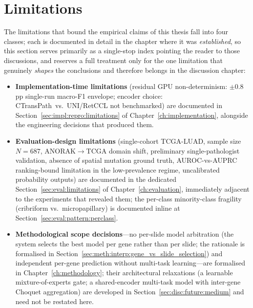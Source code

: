 \section{Limitations}
\label{sec:disc:limitations}

The limitations that bound the empirical claims of this thesis
fall into four classes; each is documented in detail in the
chapter where it was \emph{established}, so this section serves
primarily as a single-stop index pointing the reader to those
discussions, and reserves a full treatment only for the one
limitation that genuinely \emph{shapes} the conclusions and
therefore belongs in the discussion chapter:

\begin{itemize}
    \item \textbf{Implementation-time limitations} (residual GPU
    non-determinism: $\pm 0.8$\,pp single-run macro-F1 envelope;
    encoder choice: CTransPath~vs.\ UNI/RetCCL not benchmarked)
    are documented in
    Section~\ref{sec:impl:repro:limitations} of
    Chapter~\ref{ch:implementation}, alongside the engineering
    decisions that produced them.
    \item \textbf{Evaluation-design limitations} (single-cohort
    TCGA-LUAD, sample size $N=687$, ANORAK$\to$TCGA domain shift,
    preliminary single-pathologist validation, absence of spatial
    mutation ground truth, AUROC-vs-AUPRC ranking-bound limitation
    in the low-prevalence regime, uncalibrated probability
    outputs) are documented in the dedicated
    Section~\ref{sec:eval:limitations} of
    Chapter~\ref{ch:evaluation}, immediately adjacent to the
    experiments that revealed them; the per-class minority-class
    fragility (cribriform vs.\ micropapillary) is documented
    inline at Section~\ref{sec:eval:pattern:perclass}.
    \item \textbf{Methodological scope decisions}---no per-slide
    model arbitration (the system selects the best model per
    gene rather than per slide; the rationale is formalised in
    Section~\ref{sec:meth:interp:gene_vs_slide_selection}) and
    independent per-gene prediction without multi-task
    learning---are formalised in
    Chapter~\ref{ch:methodology}; their architectural relaxations
    (a learnable mixture-of-experts gate; a shared-encoder
    multi-task model with inter-gene Choquet aggregation) are
    developed in
    Section~\ref{sec:disc:future:medium} and need not be restated
    here.
\end{itemize}

